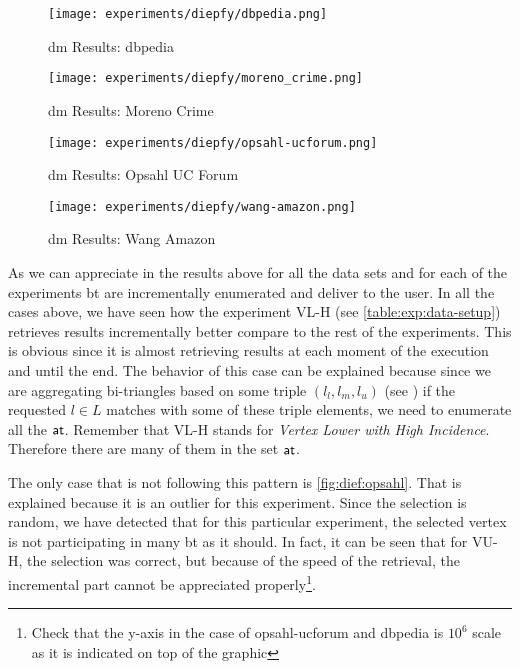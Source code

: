 \begin{figure}[!htb]
  \centering
  \begin{minipage}{0.5\textwidth}
   \texttt{[image: experiments/diepfy/dbpedia.png]}
    \caption{\acrshort{dm} Results: \acrshort{dbpedia}}
    \label{fig:dief:dbpedia}
  \end{minipage}%
  \begin{minipage}{0.5\textwidth}
   \texttt{[image: experiments/diepfy/moreno\_crime.png]}
    \caption{\acrshort{dm} Results: Moreno Crime}
    \label{fig:dief:moreno}
  \end{minipage}
\end{figure}
%
\begin{figure}[!htb]
  \centering
  \begin{minipage}{0.5\textwidth}
   \texttt{[image: experiments/diepfy/opsahl-ucforum.png]}
    \caption{\acrshort{dm} Results: Opsahl UC Forum}
    \label{fig:dief:opsahl}
  \end{minipage}%
  \begin{minipage}{0.5\textwidth}
    \texttt{[image: experiments/diepfy/wang-amazon.png]}
     \caption{\acrshort{dm} Results: Wang Amazon}
     \label{fig:dief:wang}
   \end{minipage}
 \end{figure}

As we can appreciate in the results above for all the data sets and for each of the experiments \acrshort{bt} are incrementally enumerated and deliver to the user. 
In all the cases above, we have seen how the experiment VL-H (see \autoref{table:exp:data-setup}) retrieves results incrementally better compare to the rest of the experiments. 
This is obvious since it is almost retrieving results at each moment of the execution and until the end. 
The behavior of this case can be explained because since we are aggregating bi-triangles based on some triple $(l_l,l_m,l_u)$ (see ) if the requested $l \in L$ matches with some of these triple elements, 
we need to enumerate all the $\mathsf{at}$. Remember that VL-H stands for \emph{Vertex Lower with High Incidence}. Therefore there are many of them in the set $\mathsf{at}$.

The only case that is not following this pattern is \autoref{fig:dief:opsahl}. That is explained because it is an outlier for this experiment.
Since the selection is random, we have detected that for this particular experiment, the selected vertex is not participating in many \acrshort{bt} as it should.
In fact, it can be seen that for VU-H, the selection was correct, but because of the speed of the retrieval, the incremental part cannot be appreciated properly\footnote{Check that the y-axis in the case of opsahl-ucforum and \acrshort{dbpedia} is $10^6$ scale as it is indicated on top of the graphic}. 

